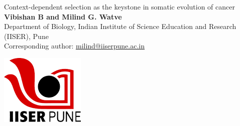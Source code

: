 \documentclass[a0,landscape]{a0poster}
\begin{document}

\begin{minipage}[l]{0.95\linewidth}
	{ \color{NavyBlue} {\fontsize{100}{120}\selectfont Context-dependent selection as the keystone in somatic evolution of cancer}}\\[1.5cm] %
	{\huge \textbf{Vibishan B and Milind G. Watve}}\\[1cm] %
	{\LARGE Department of Biology, Indian Institute of Science Education and Research (IISER), Pune}\\[0.4cm] %
	{\LARGE Corresponding author: {\color{Red}\underline{milind@iiserpune.ac.in}}}
\end{minipage}
\begin{minipage}[r]{0.05\linewidth}
	\includegraphics[width=\linewidth]{logo.png}
\end{minipage}
\end{document}
